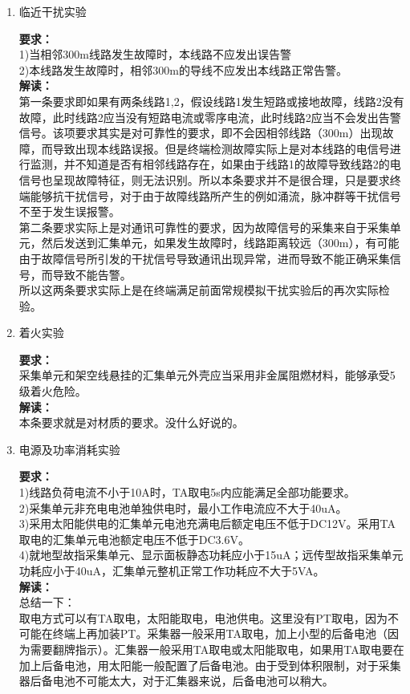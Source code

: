 \documentclass{article}
\begin{document}
\begin{CJK}{UTF8}{gbsn}
\begin{enumerate}
\item 临近干扰实验	
	\par
	\textbf{要求：}\\
	1)当相邻300m线路发生故障时，本线路不应发出误告警\\
	2)本线路发生故障时，相邻300m的导线不应发出本线路正常告警。\\
	\textbf{解读：}\\
	第一条要求即如果有两条线路1,2，假设线路1发生短路或接地故障，线路2没有故障，此时线路2应当没有短路电流或零序电流，此时线路2应当不会发出告警信号。该项要求其实是对可靠性的要求，即不会因相邻线路（300m）出现故障，而导致出现本线路误报。但是终端检测故障实际上是对本线路的电信号进行监测，并不知道是否有相邻线路存在，如果由于线路1的故障导致线路2的电信号也呈现故障特征，则无法识别。所以本条要求并不是很合理，只是要求终端能够抗干扰信号，对于由于故障线路所产生的例如涌流，脉冲群等干扰信号不至于发生误报警。\\
	第二条要求实际上是对通讯可靠性的要求，因为故障信号的采集来自于采集单元，然后发送到汇集单元，如果发生故障时，线路距离较远（300m），有可能由于故障信号所引发的干扰信号导致通讯出现异常，进而导致不能正确采集信号，而导致不能告警。
\\
所以这两条要求实际上是在终端满足前面常规模拟干扰实验后的再次实际检验。
\item 着火实验
	\par
	\textbf{要求：}\\
	采集单元和架空线悬挂的汇集单元外壳应当采用非金属阻燃材料，能够承受5级着火危险。\\
	\textbf{解读：}\\
	本条要求就是对材质的要求。没什么好说的。
\item 电源及功率消耗实验
	\par
	\textbf{要求：}\\
	1)线路负荷电流不小于10A时，TA取电5s内应能满足全部功能要求。\\
	2)采集单元非充电电池单独供电时，最小工作电流应不大于40uA。\\
	3)采用太阳能供电的汇集单元电池充满电后额定电压不低于DC12V。采用TA取电的汇集单元电池额定电压不低于DC3.6V。\\
	4)就地型故指采集单元、显示面板静态功耗应小于15uA；远传型故指采集单元功耗应小于40uA，汇集单元整机正常工作功耗应不大于5VA。\\
	\textbf{解读：}\\
	总结一下：\\
	取电方式可以有TA取电，太阳能取电，电池供电。这里没有PT取电，因为不可能在终端上再加装PT。采集器一般采用TA取电，加上小型的后备电池（因为需要翻牌指示）。汇集器一般采用TA取电或太阳能取电，如果用TA取电要在加上后备电池，用太阳能一般配置了后备电池。由于受到体积限制，对于采集器后备电池不可能太大，对于汇集器来说，后备电池可以稍大。\\

\end{enumerate}
\end{CJK}
\end{document}
